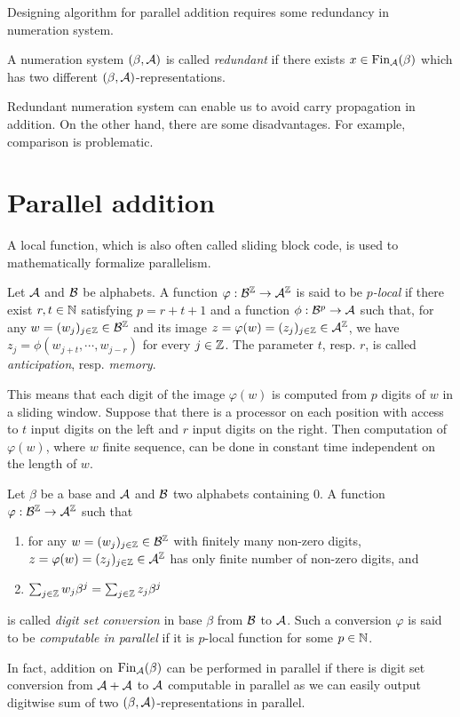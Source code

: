 Designing algorithm for parallel addition requires some redundancy in numeration system. 
\begin{defn}
A numeration system $(\beta,\mathcal{A})$ is called \emph{redundant} if there exists $x \in \text{Fin}_{\mathcal{A}}(\beta)$ which has two different $(\beta,\mathcal{A})$-representations.
\end{defn}
Redundant numeration system can enable us to avoid carry propagation in addition. On the other hand, there are some disadvantages. For example, comparison is problematic.  


\section{Parallel addition}
A local function, which is also often called sliding block code, is used to mathematically formalize parallelism. 
\begin{defn}
Let $\mathcal{A}$ and $\mathcal{B}$ be alphabets. A function $\varphi:\mathcal{B}^{\mathbb{Z}} \rightarrow \mathcal{A}^{\mathbb{Z}}$ is said to be \emph{$p$-local} if there exist $r,t\in\mathbb{N}$ satisfying $p=r+t+1$ and a function $\phi: \mathcal{B}^p \rightarrow \mathcal{A}$ such that, for any $w=(w_j)_{j\in\mathbb{Z}}\in\mathcal{B}^{\mathbb{Z}}$ and its image $z=\varphi(w)=(z_j)_{j\in\mathbb{Z}}\in\mathcal{A}^{\mathbb{Z}}$, we have $z_j=\phi(w_{j+t},\cdots,w_{j-r})$ for every $j\in\mathbb{Z}$. The parameter $t$, resp. $r$, is called \emph{anticipation}, resp. \emph{memory}.
\end{defn}
This means that each digit of the image $\varphi(w)$ is computed from $p$ digits of $w$ in a sliding window. Suppose that there is a processor on  each position with access to $t$ input digits on the left and $r$ input digits on the right. Then computation of $\varphi(w)$, where $w$ finite sequence, can be done in constant time independent on the length of $w$.   
  
\begin{defn}
\label{def:digitSetConversion}
Let $\beta$ be a base and $\mathcal{A}$ and $\mathcal{B}$ two alphabets containing 0. A function $\varphi:\mathcal{B}^{\mathbb{Z}}\rightarrow \mathcal{A}^{\mathbb{Z}}$ such that
  \begin{enumerate}
      \item for any $w=(w_j)_{j\in\mathbb{Z}}\in\mathcal{B}^{\mathbb{Z}}$ with finitely many non-zero digits, $z=\varphi(w)=(z_j)_{j\in\mathbb{Z}}\in\mathcal{A}^{\mathbb{Z}}$ has only finite number of non-zero digits, and
      \item $\sum_{j\in\mathbb{Z}} w_j \beta^j= \sum_{j\in\mathbb{Z}} z_j \beta^j$
  \end{enumerate}
  is called \emph{digit set conversion} in base $\beta$ from $\mathcal{B}$ to $\mathcal{A}$. Such a conversion $\varphi$ is said to be \emph{computable in parallel} if it is $p$-local function for some $p\in\mathbb{N}$. 
\end{defn}
In fact, addition on $\text{Fin}_{\mathcal{A}}(\beta)$ can be performed in parallel if there is digit set conversion from $\mathcal{A}+\mathcal{A}$ to $\mathcal{A}$ computable in  parallel as we can easily output digitwise sum of two $(\beta,\mathcal{A})$-representations in parallel.   


